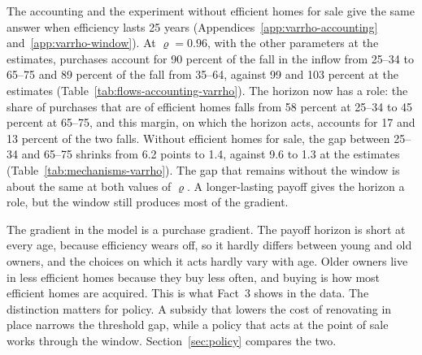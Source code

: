 The accounting and the experiment without efficient homes for sale give the
same answer when efficiency lasts 25 years (Appendices~\ref{app:varrho-accounting} and~\ref{app:varrho-window}). At
$\varrho=0.96$, with the other parameters at the estimates, purchases account
for 90 percent of the fall in the inflow from 25--34 to 65--75 and 89 percent
of the fall from 35--64, against 99 and 103 percent at the estimates
(Table~\ref{tab:flows-accounting-varrho}). The horizon now has a role: the
share of purchases that are of efficient homes falls from 58 percent at
25--34 to 45 percent at 65--75, and this margin, on which the horizon acts,
accounts for 17 and 13 percent of the two falls. Without efficient homes for
sale, the gap between 25--34 and 65--75 shrinks from 6.2 points to 1.4,
against 9.6 to 1.3 at the estimates (Table~\ref{tab:mechanisms-varrho}). The
gap that remains without the window is about the same at both values of
$\varrho$. A longer-lasting payoff gives the horizon a role, but the window
still produces most of the gradient.

The gradient in the model is a purchase gradient. The payoff horizon is
short at every age, because efficiency wears off, so it hardly differs
between young and old owners, and the choices on which it acts hardly vary
with age. Older owners live in less efficient homes because they buy less
often, and buying is how most efficient homes are acquired. This is what
Fact~3 shows in the data. The distinction matters for policy. A subsidy that
lowers the cost of renovating in place narrows the threshold gap, while a
policy that acts at the point of sale works through the window. Section~\ref{sec:policy}
compares the two.

% 
